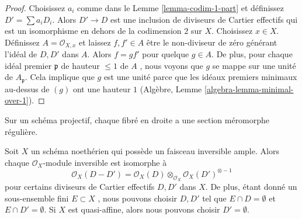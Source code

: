 \begin{proof}
Choisissez  $a_i$  comme dans le Lemme  \ref{lemma-codim-1-part}  et définissez
 $D' = \sum a_i D_i$. Alors  $D' \to D$  est une inclusion de diviseurs de Cartier
effectifs qui est un isomorphisme en dehors de la codimension  $2$  sur
 $X$. Choisissez  $x \in X$. Définissez  $A = \mathcal{O}_{X, x}$  et laissez
 $f, f' \in A$  être le non-diviseur de zéro générant l'idéal de  $D, D'$  dans
 $A$. Alors  $f = gf'$  pour quelque  $g \in A$. De plus, pour chaque
idéal premier  $\mathfrak p$  de hauteur  $\leq 1$  de  $A$ , nous voyons
que  $g$  se mappe sur une unité de  $A_\mathfrak p$. Cela implique que
 $g$  est une unité parce que les idéaux premiers minimaux au-dessus de
 $(g)$  ont une hauteur  $1$  (Algèbre, Lemme  \ref{algebra-lemma-minimal-over-1}).
\end{proof}

\begin{lemma}
\label{lemma-quasi-projective-Noetherian-pic-effective-Cartier}
\begin{slogan}
Sur un schéma projectif, chaque fibré en droite a une section méromorphe
régulière.
\end{slogan}
Soit  $X$  un schéma noethérien qui possède un faisceau inversible ample.
Alors chaque  $\mathcal{O}_X$-module inversible est isomorphe à
$$
\mathcal{O}_X(D - D') =
\mathcal{O}_X(D) \otimes_{\mathcal{O}_X} \mathcal{O}_X(D')^{\otimes -1}
$$
pour certains diviseurs de Cartier effectifs  $D, D'$  dans  $X$. De
plus, étant donné un sous-ensemble fini  $E \subset X$ , nous pouvons choisir
 $D, D'$  tel que  $E \cap D = \emptyset$  et  $E \cap D' = \emptyset$. Si  $X$  est
quasi-affine, alors nous pouvons choisir  $D' = \emptyset$.
\end{lemma}

